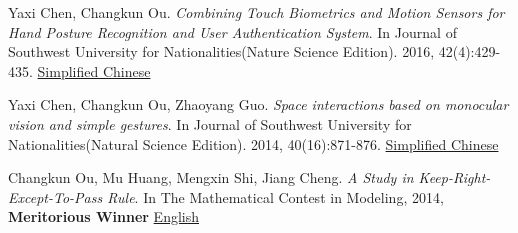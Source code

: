     \item{
        Yaxi Chen, Changkun Ou. 
        \emph{Combining Touch Biometrics and Motion Sensors for Hand Posture Recognition and User Authentication System}. 
        In Journal of Southwest University for Nationalities(Nature Science Edition). 
        2016, 42(4):429-435. \href{https://changkun.us/files/cv/touch.swun.html}{Simplified Chinese}
    }
    \item{
        Yaxi Chen, Changkun Ou, Zhaoyang Guo.
        \emph{Space interactions based on monocular vision and simple gestures}. 
        In Journal of Southwest University for Nationalities(Natural Science Edition). 
        2014, 40(16):871-876. \href{https://changkun.us/files/cv/vision.swun.html}{Simplified Chinese}
    }
    \item{
        Changkun Ou, Mu Huang, Mengxin Shi, Jiang Cheng. 
        \emph{A Study in Keep-Right-Except-To-Pass Rule}. 
        In The Mathematical Contest in Modeling, 2014, \textbf{Meritorious Winner} \href{hhttps://github.com/changkun/papers/blob/master/papers/ou2014car-paper.pdf}{English}
    }
 \resumeSubHeadingListEnd